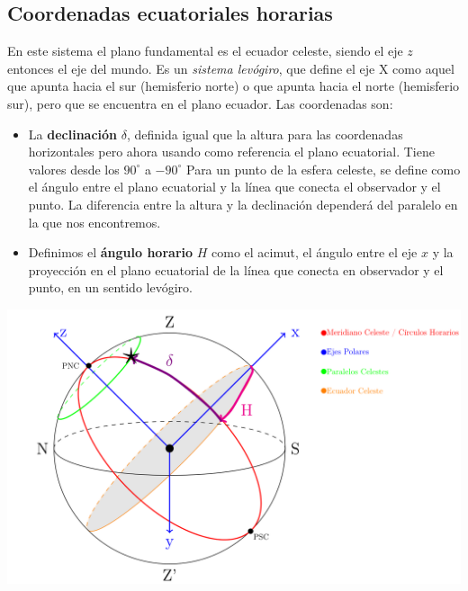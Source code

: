 \subsection{Coordenadas ecuatoriales horarias}

En este sistema el plano fundamental es el ecuador celeste, siendo el eje $z$ entonces el eje del mundo. Es un \textit{sistema levógiro}, que define el eje X como aquel que apunta hacia el sur (hemisferio norte) o que apunta hacia el norte (hemisferio sur), pero que se encuentra en el plano ecuador. Las coordenadas son:

\hspace{-8.0mm} \vspace{1.0mm} \begin{minipage}{0.6\textwidth}
	\begin{itemize}
		\item La \textbf{declinación} $\delta$, definida igual que la altura para las coordenadas horizontales pero ahora usando como referencia el plano ecuatorial.  Tiene valores desde los $90^\circ$ a $-90^\circ$ Para un punto de la esfera celeste, se define como el ángulo entre el plano ecuatorial y la línea que conecta el observador y el punto. La diferencia entre la altura y la declinación dependerá del paralelo en la que nos encontremos.
		\item Definimos el \textbf{ángulo horario} $H$ como el acimut, el ángulo entre el eje $x$ y la proyección en el plano ecuatorial de la línea que conecta en observador y el punto, en un sentido levógiro.
	\end{itemize}
\end{minipage}	\hfill
\begin{minipage}{0.35\textwidth} \centering
	\includegraphics[width=1.1\linewidth]{Cuerpo/Ch_01/Coordenadas_Horarias.png}
	 	\label{Fig:01-horarias}
\end{minipage}


